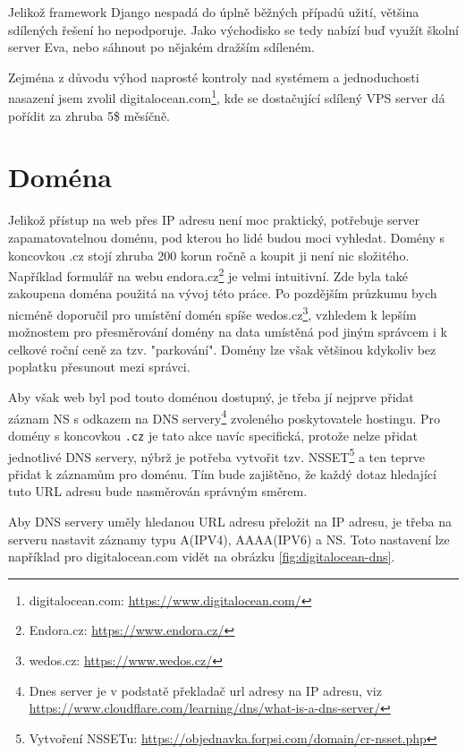 Jelikož framework Django nespadá do úplně běžných případů užití, většina sdílených řešení ho nepodporuje. Jako východisko se tedy nabízí buď využít školní server Eva, nebo sáhnout po nějakém dražším sdíleném.
\par Zejména z důvodu výhod naprosté kontroly nad systémem a jednoduchosti nasazení jsem zvolil digitalocean.com\footnote{digitalocean.com: \url{https://www.digitalocean.com/}}, kde se dostačující sdílený VPS server dá pořídit za zhruba 5\$ měsíčně.

\section{Doména}
Jelikož přístup na web přes IP adresu není moc praktický, potřebuje server zapamatovatelnou doménu, pod kterou ho lidé budou moci vyhledat. Domény s koncovkou .cz stojí zhruba 200 korun ročně a koupit ji není nic složitého. Například formulář na webu endora.cz\footnote{Endora.cz: \url{https://www.endora.cz/}} je velmi intuitivní. Zde byla také zakoupena doména použitá na vývoj této práce. Po pozdějším průzkumu bych nicméně doporučil pro umístění domén spíše wedos.cz\footnote{wedos.cz: \url{https://www.wedos.cz/}}, vzhledem k lepším možnostem pro přesměrování domény na data umístěná pod jiným správcem i k celkové roční ceně za tzv. "parkování". Domény lze však většinou kdykoliv bez poplatku přesunout mezi správci.  
\par Aby však web byl pod touto doménou dostupný, je třeba jí nejprve přidat záznam NS s odkazem na DNS servery\footnote{Dnes server je v podstatě překladač url adresy na IP adresu, viz \url{https://www.cloudflare.com/learning/dns/what-is-a-dns-server/}} zvoleného poskytovatele hostingu. Pro domény s koncovkou \texttt{.cz} je tato akce navíc specifická, protože nelze přidat jednotlivé DNS servery, nýbrž je potřeba vytvořit tzv. NSSET\footnote{Vytvoření NSSETu: \url{https://objednavka.forpsi.com/domain/cr-nsset.php}} a ten teprve přidat k záznamům pro doménu. Tím bude zajištěno, že každý dotaz hledající tuto URL adresu bude nasměrován správným směrem.

\par Aby DNS servery uměly hledanou URL adresu přeložit na IP adresu, je třeba na serveru nastavit záznamy typu A(IPV4), AAAA(IPV6) a NS. Toto nastavení lze například pro digitalocean.com vidět na obrázku \ref{fig:digitalocean-dns}.


